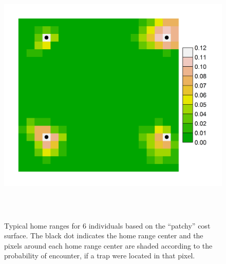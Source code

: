 \documentclass[12pt]{article}
\begin{document}
\begin{figure}
\begin{center}
\includegraphics[height=5in,width=6in]{figs/home_rangesv2}
\end{center}
\caption{
Typical home ranges for 6 individuals based on the ``patchy'' cost surface.
The black dot indicates the home
  range center and the pixels around each home range center are shaded
according to the probability of encounter, if a trap were located in
that pixel.
}
\label{fig.homeranges}
\end{figure}

\clearpage
\newpage
\end{document}
